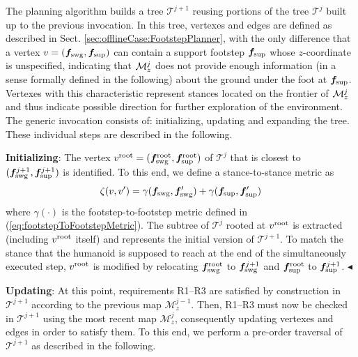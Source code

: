The planning algorithm builds a tree $\mathcal{T}^{j+1}$ reusing portions of the tree $\mathcal{T}^{j}$ built up to the previous invocation. 
In this tree, vertexes and edges are defined as described in Sect. \ref{sec:offlineCase:FootstepPlanner}, with the only difference that a vertex $v = ({\bm{f}}_{\rm swg}, {\bm{f}}_{\rm sup})$ can contain a support footstep ${\bm{f}}_{\rm sup}$ whose $z$-coordinate is unspecified, indicating that ${\cal M}_z^j$ does not provide enough information (in a sense formally defined in the following) about the ground under the foot at ${\bm{f}}_{\rm sup}$. 
Vertexes with this characteristic represent stances located on the frontier of ${\cal M}_z^j$ and thus indicate possible direction for further exploration of the environment. 
%
The generic invocation consists of: initializing, updating and expanding the tree. These individual steps are described in the following.

{\bf Initializing}: The vertex $v^{\rm root} = ({\bm{f}}_{\rm swg}^{\rm root}, {\bm{f}}_{\rm sup}^{\rm root})$ of $\mathcal{T}^{j}$ that is closest to $({\bm{f}}_{\rm swg}^{j+1}, {\bm{f}}_{\rm sup}^{j+1})$ is identified. To this end, we define a stance-to-stance metric as
\begin{equation}
    \label{eq:metricIdentifyRoot}
    \zeta(v, v') = \gamma({\bm{f}}_{\rm swg}, {\bm{f}}'_{\rm swg}) + \gamma({\bm{f}}_{\rm sup}, {\bm{f}}'_{\rm sup}) 
\end{equation}
where $\gamma(\cdot)$ is the footstep-to-footstep metric defined in (\ref{eq:footstepToFootstepMetric}).
The subtree of $\mathcal{T}^{j}$ rooted at $v^{\rm root}$ is extracted (including $v^{\rm root}$ itself) and represents the initial version of $\mathcal{T}^{j+1}$.
To match the stance that the humanoid is supposed to reach at the end of the simultaneously executed step, $v^{\rm root}$ is modified by relocating ${\bm{f}}_{\rm swg}^{\rm root}$ to ${\bm{f}}_{\rm swg}^{j+1}$ and ${\bm{f}}_{\rm sup}^{\rm root}$ to ${\bm{f}}_{\rm sup}^{j+1}$. \hfill $\blacktriangleleft$

{\bf Updating}: At this point, requirements R1--R3 are satisfied by construction in $\mathcal{T}^{j+1}$ according to the previous map $\mathcal{M}_z^{j-1}$.
Then, R1--R3 must now be checked in $\mathcal{T}^{j+1}$ using the most recent map $\mathcal{M}_z^{j}$, consequently updating vertexes and edges in order to satisfy them.
To this end, we perform a pre-order traversal of $\mathcal{T}^{j+1}$ as described in the following.

